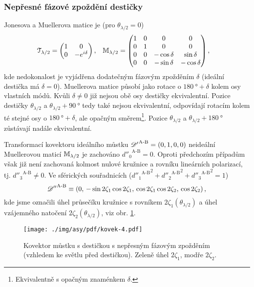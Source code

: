 \subsubsection*{Nepřesné fázové zpoždění destičky}
Jonesova a Muellerova matice je (pro $\theta_{\lambda/2}=0$)
\begin{align}
    \mathcal{T}_{\lambda/2} &= \begin{pmatrix} 1&0 \\ 0&-e^{i\delta} \end{pmatrix} , &
    \mathbb{M}_{\lambda/2} &= \begin{pmatrix} 1&0&0&0 \\ 0&1&0&0 \\ 0&0&-\cos\delta&\sin\delta \\ 0&0&-\sin\delta&-\cos\delta \end{pmatrix} ,
\end{align}
kde nedokonalost je vyjádřena dodatečným fázovým zpožděním $\delta$ (ideální destička má $\delta=0$).
Muellerova matice působí jako rotace o $\SI{180}{\degree}+\delta$ kolem osy vlastních módů.
Kvůli $\delta\neq0$ již nejsou obě osy destičky ekvivalentní.
Pozice destičky $\theta_{\lambda/2}$ a $\theta_{\lambda/2}+\SI{90}{\degree}$ tedy také nejsou ekvivalentní, odpovídají rotacím kolem té stejné osy o $\SI{180}{\degree}+\delta$, ale opačným směrem\footnote{Ekvivalentně s opačným znaménkem $\delta$.}.
Pozice $\theta_{\lambda/2}$ a $\theta_{\lambda/2}+\SI{180}{\degree}$ zůstávají nadále ekvivalentní.

Transformací kovektoru ideálního můstku ${\mathscr{D}'}^\textrm{A-B}=(0, 1, 0, 0)$ neideální Muellerovou maticí $\mathbb{M}_{\lambda/2}$ je zachováno ${d''_0}^\textrm{A-B}=0$.
Oproti předchozím případům však již není zachovaná kolmost nulové kružnice a rovníku lineárních polarizací, tj. ${d''_3}^\textrm{A-B}\neq0$.
Ve sférických souřadnicích (${{d''_1}^\textrm{A-B}}^2+{{d''_2}^\textrm{A-B}}^2+{{d''_3}^\textrm{A-B}}^2=1$)
\begin{equation}
    {\mathscr{D}''}^\textrm{A-B} \equiv (0,\, -\sin2\zeta_1\cos2\zeta_1,\, \cos2\zeta_1\cos2\zeta_2,\, \cos2\zeta_2) \,,
\end{equation}
kde jsme označili úhel průsečíku kružnice s rovníkem $2\zeta_1(\theta_{\lambda/2})$ a úhel vzájemného natočení $2\zeta_2(\theta_{\lambda/2})$, viz obr. \ref{fig:mustek-nedokonale-desticka}.

\begin{figure}[htbp]
    \centering
    \texttt{[image: ./img/asy/pdf/kovek-4.pdf]}
    \caption{Kovektor můstku s destičkou s nepřesným fázovým zpožděním (vzhledem ke světlu před destičkou). Zeleně úhel $2\zeta_1$, modře $2\zeta_2$.}
    \label{fig:mustek-nedokonale-desticka}
\end{figure}


